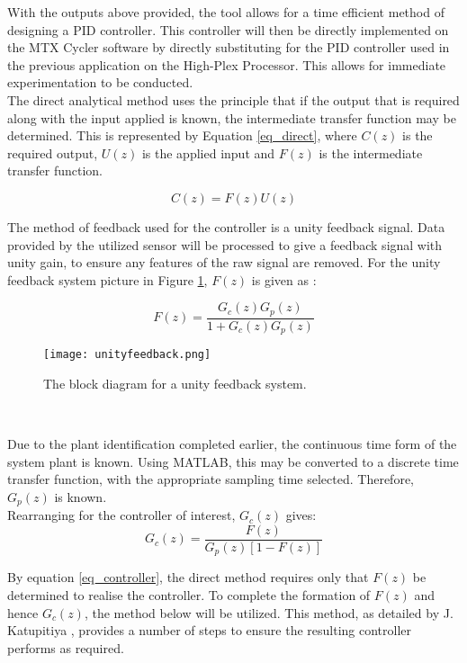 With the outputs above provided, the tool allows for a time efficient method of designing a PID controller. This controller will then be directly implemented on the MTX Cycler software by directly substituting for the PID controller used in the previous application on the High-Plex Processor. This allows for immediate experimentation to be conducted.\\

The direct analytical method uses the principle that if the output that is required along with the input applied is known, the intermediate transfer function may be determined. This is represented by Equation \ref{eq_direct}, where $C(z)$ is the required output, $U(z)$ is the applied input and $F(z)$ is the intermediate transfer function.

\begin{equation}
\label{eq_direct}
C(z) = F(z)U(z)
\end{equation}

The method of feedback used for the controller is a unity feedback signal. Data provided by the utilized sensor will be processed to give a feedback signal with unity gain, to ensure any features of the raw signal are removed. For the unity feedback system picture in Figure \ref{fig:unityfeedback}, $F(z)$ is given as \cite{UNSW}:

\begin{equation}
F(z) = \frac{G_c(z)G_p(z)}{1+G_c(z)G_p(z)}
\end{equation}

\begin{figure}[!htb]
	\centering
	\texttt{[image: unityfeedback.png]}
	\caption[Unity feedback system.]{The block diagram for a unity feedback system. \cite{UNSW}}
	\label{fig:unityfeedback}
\end{figure} 
\FloatBarrier

Due to the plant identification completed earlier, the continuous time form of the system plant is known. Using MATLAB, this may be converted to a discrete time transfer function, with the appropriate sampling time selected. Therefore, $G_p(z)$ is known.\\

Rearranging for the controller of interest, $G_c(z)$ gives:
\begin{equation}
\label{eq_controller}
G_c(z) = \frac{F(z)}{G_p(z)[1-F(z)]}
\end{equation}

By equation \ref{eq_controller}, the direct method requires only that $F(z)$ be determined to realise the controller. To complete the formation of $F(z)$ and hence $G_c(z)$, the method below will be utilized. This method, as detailed by J. Katupitiya \cite{UNSW}, provides a number of steps to ensure the resulting controller performs as required.\\

